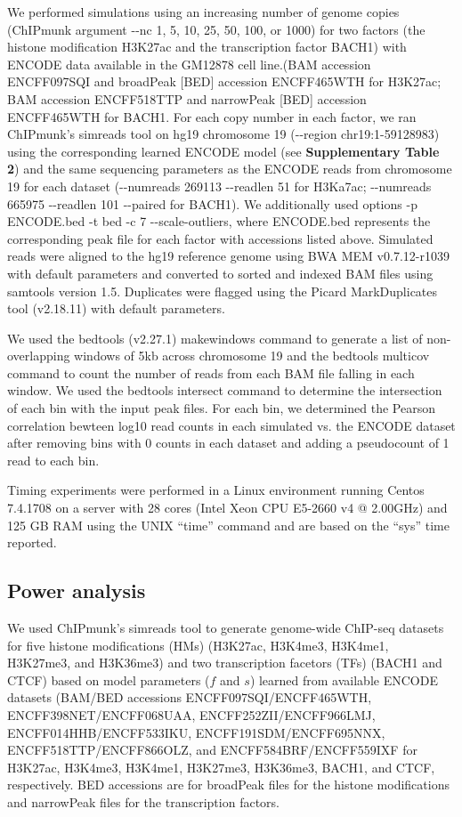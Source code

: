 \documentclass[12pt]{article}
\begin{document}
We performed simulations using an increasing number of genome copies (ChIPmunk argument -{}-nc 1, 5, 10, 25, 50, 100, or 1000) for two factors (the histone modification H3K27ac and the transcription factor BACH1) with ENCODE data available in the GM12878 cell line.(BAM accession ENCFF097SQI and broadPeak [BED] accession ENCFF465WTH for H3K27ac; BAM accession ENCFF518TTP and narrowPeak [BED] accession ENCFF465WTH for BACH1.
For each copy number in each factor, we ran ChIPmunk's simreads tool on hg19 chromosome 19 (-{}-region chr19:1-59128983) using the corresponding learned ENCODE model (see \textbf{Supplementary Table 2}) and the same sequencing parameters as the ENCODE reads from chromosome 19 for each dataset (-{}-numreads 269113 -{}-readlen 51 for H3Ka7ac; -{}-numreads 665975 -{}-readlen 101 -{}-paired for BACH1). 
We additionally used options -p ENCODE.bed -t bed -c 7 -{}-scale-outliers, where ENCODE.bed represents the corresponding peak file for each factor with accessions listed above.
Simulated reads were aligned to the hg19 reference genome using BWA MEM \cite{bwamem} v0.7.12-r1039 with default parameters and converted to sorted and indexed BAM files using samtools \cite{samtools} version 1.5. Duplicates were flagged using the Picard \cite{picard} MarkDuplicates tool (v2.18.11) with default parameters.

We used the bedtools \cite{bedtools} (v2.27.1) makewindows command to generate a list of non-overlapping windows of 5kb across chromosome 19 and the bedtools multicov command to count the number of reads from each BAM file falling in each window. We used the bedtools intersect command to determine the intersection of each bin with the input peak files. For each bin, we determined the Pearson correlation bewteen log10 read counts in each simulated vs. the ENCODE dataset after removing bins with 0 counts in each dataset and adding a pseudocount of 1 read to each bin.

Timing experiments were performed in a Linux environment running Centos 7.4.1708 on a server with 28 cores (Intel\textsuperscript{\textregistered} Xeon\textsuperscript{\textregistered} CPU E5-2660 v4 @ 2.00GHz) and 125 GB RAM using the UNIX ``time'' command and are based on the ``sys'' time reported. %


\subsection*{Power analysis}
We used ChIPmunk's simreads tool to generate genome-wide ChIP-seq datasets for five histone modifications (HMs) (H3K27ac, H3K4me3, H3K4me1, H3K27me3, and H3K36me3) and two transcription facetors (TFs) (BACH1 and CTCF) based on model parameters ($f$ and $s$) learned from available ENCODE datasets (BAM/BED accessions ENCFF097SQI/ENCFF465WTH, ENCFF398NET/ENCFF068UAA, ENCFF252ZII/ENCFF966LMJ, ENCFF014HHB/ENCFF533IKU, ENCFF191SDM/ENCFF695NNX, ENCFF518TTP/ENCFF866OLZ, and ENCFF584BRF/ENCFF559IXF for H3K27ac, H3K4me3, H3K4me1, H3K27me3, H3K36me3, BACH1, and CTCF, respectively. BED accessions are for broadPeak files for the histone modifications and narrowPeak files for the transcription factors.
\end{document}
